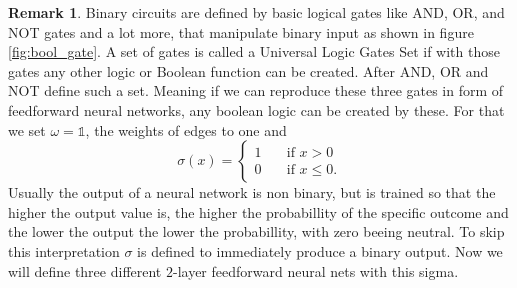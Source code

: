 \documentclass{article}
\theoremstyle{definition}
\newtheorem{remark}[theorem]{Remark}
\begin{document}
\begin{remark}
Binary circuits are defined by basic logical gates like AND, OR, and NOT gates and a lot more, that manipulate binary input as shown in figure \ref{fig:bool_gate}. A set of gates is called a Universal Logic Gates Set if with those gates any other logic or Boolean function can be created. After \cite{quine1955way} AND, OR and NOT define such a set. Meaning if we can reproduce these three gates in form of feedforward neural networks, any boolean logic can be created by these. For that we set $\omega=\mathds{1}$, the weights of edges to one and
\[ \sigma(x) = 
  \begin{cases}
    1       & \quad \text{if } x > 0\\
    0  		& \quad \text{if } x \leq 0.
  \end{cases}
\]
Usually the output of a neural network is non binary, but is trained so that the higher the output value is, the higher the probabillity of the specific outcome and the lower the output the lower the probabillity, with zero beeing neutral. To skip this interpretation $\sigma$ is defined to immediately produce a binary output. Now we will define three different $2$-layer feedforward neural nets with this sigma.



\end{remark}
\end{document}
